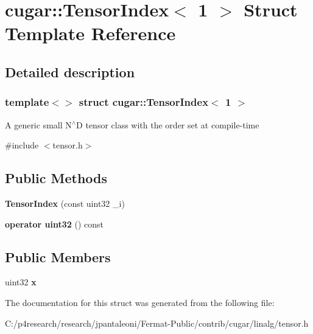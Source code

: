 \hypertarget{structcugar_1_1_tensor_index_3_011_01_4}{}\section{cugar\+:\+:Tensor\+Index$<$ 1 $>$ Struct Template Reference}
\label{structcugar_1_1_tensor_index_3_011_01_4}


\subsection{Detailed description}
\subsubsection*{template$<$$>$\newline
struct cugar\+::\+Tensor\+Index$<$ 1 $>$}

A generic small N$^\wedge$D tensor class with the order set at compile-\/time 

{\ttfamily \#include $<$tensor.\+h$>$}

\subsection*{Public Methods}
\begin{DoxyCompactItemize}
\item 
\mbox{\label{structcugar_1_1_tensor_index_3_011_01_4_a1863d2ac16cd71cf916c1221fe783a8b}} 
{\bfseries Tensor\+Index} (const uint32 \+\_\+i)
\item 
\mbox{\label{structcugar_1_1_tensor_index_3_011_01_4_a72e412709ebd1bb424761021724477b6}} 
{\bfseries operator uint32} () const
\end{DoxyCompactItemize}
\subsection*{Public Members}
\begin{DoxyCompactItemize}
\item 
\mbox{\label{structcugar_1_1_tensor_index_3_011_01_4_a6d32f6d71338cc987546e18f39659400}} 
uint32 {\bfseries x}
\end{DoxyCompactItemize}


The documentation for this struct was generated from the following file\+:\begin{DoxyCompactItemize}
\item 
C\+:/p4research/research/jpantaleoni/\+Fermat-\/\+Public/contrib/cugar/linalg/tensor.\+h\end{DoxyCompactItemize}

